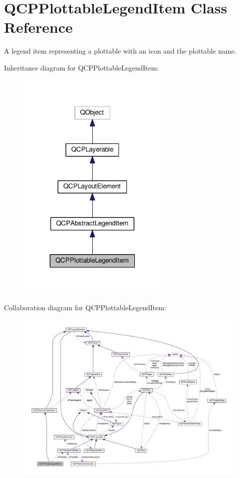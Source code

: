 \hypertarget{classQCPPlottableLegendItem}{}\section{Q\+C\+P\+Plottable\+Legend\+Item Class Reference}
\label{classQCPPlottableLegendItem}


A legend item representing a plottable with an icon and the plottable name.  




Inheritance diagram for Q\+C\+P\+Plottable\+Legend\+Item\+:
\nopagebreak
\begin{figure}[H]
\begin{center}
\leavevmode
\includegraphics[width=208pt]{classQCPPlottableLegendItem__inherit__graph}
\end{center}
\end{figure}


Collaboration diagram for Q\+C\+P\+Plottable\+Legend\+Item\+:
\nopagebreak
\begin{figure}[H]
\begin{center}
\leavevmode
\includegraphics[width=350pt]{classQCPPlottableLegendItem__coll__graph}
\end{center}
\end{figure}
